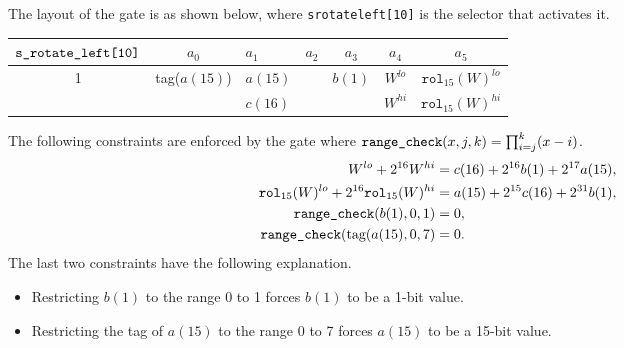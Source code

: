 \documentclass[10pt]{article}
\begin{document}
The layout of the gate is as shown below, where \texttt{s\textunderscore rotate\textunderscore left[10]} is the selector that activates it.

\begin{center}
  \begin{tabular}{c|c|l|l|c|c|c}
    $\texttt{s\textunderscore rotate\textunderscore left[10]}$ & $a_0$ & $a_1$ & $a_2$ & $a_3$ & $a_4$ & $a_5$ \\ \hline
    1  & tag($a(15)$) & $a(15)$ &                        & $b(1)$      & $W^{lo}$  & $\texttt{rol}_{15}(W)^{lo}$  \\ 
       &              & $c(16)$ &                        &             & $W^{hi}$  & $\texttt{rol}_{15}(W)^{hi}$  \\ \hline
  \end{tabular}
\end{center}

The following constraints are enforced by the gate where $\texttt{range\textunderscore check}(x, j, k) = \prod_{i=j}^k (x-i)$.
\begin{align*}
  W^{lo} + 2^{16} W^{hi} & = c(16) + 2^{16} b(1) + 2^{17} a(15),\\
  \texttt{rol}_{15}(W)^{lo} + 2^{16} \texttt{rol}_{15}(W)^{hi} & = a(15) + 2^{15} c(16) + 2^{31} b(1),\\
  \texttt{range\textunderscore check}(b(1), 0, 1) & = 0,\\
  \texttt{range\textunderscore check}(\text{tag}(a(15), 0, 7) & = 0.
\end{align*}
The last two constraints have the following explanation.
\begin{itemize}
\item Restricting $b(1)$ to the range 0 to 1 forces $b(1)$ to be a 1-bit value.
\item Restricting the tag of $a(15)$ to the range 0 to 7 forces $a(15)$ to be a 15-bit value.
\end{itemize}



\newpage


\end{document}
